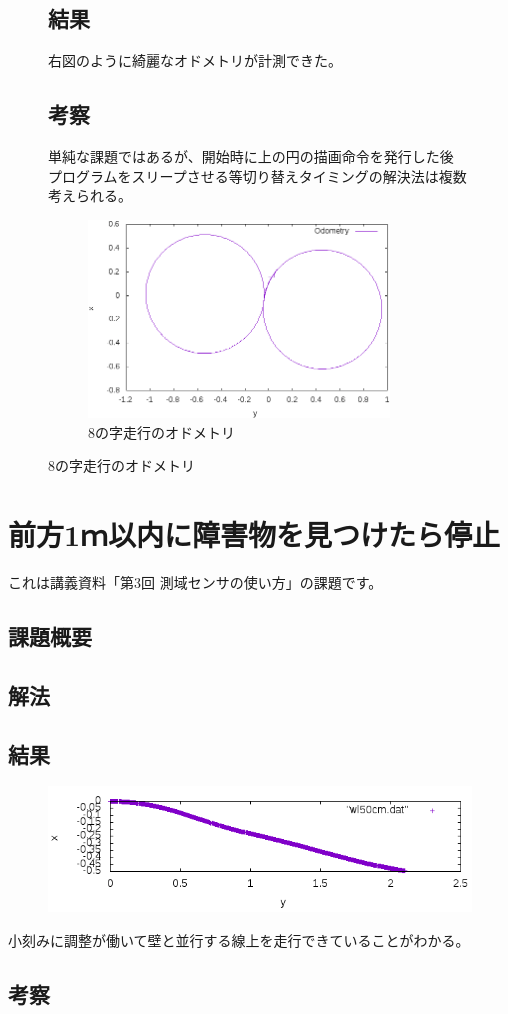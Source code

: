 \documentclass[main]{subfiles}
\begin{document}
\begin{figure}[H]
	\begin{minipage}{0.5\hsize}
		\setlength{\parindent}{1\Cwd}
		\section{結果}
		右図のように綺麗なオドメトリが計測できた。

		\section{考察}
		単純な課題ではあるが、開始時に上の円の描画命令を発行した後
		プログラムをスリープさせる等切り替えタイミングの解決法は複数考えられる。
	\end{minipage}
	\begin{minipage}{0.5\hsize}
		\begin{figure}[H]
			\centering
			\includegraphics[width=8cm]{img/eight.png}
			\caption{8の字走行のオドメトリ}
		\end{figure}
	\end{minipage}
\end{figure}

\chapter{前方1ｍ以内に障害物を見つけたら停止}

これは講義資料「第3回 測域センサの使い方」の課題です。

\section{課題概要}
\section{解法}

\section{結果}
\begin{figure}[H]
	\centering
	\includegraphics[width=15cm]{img/wl50cm.png}
\end{figure}
小刻みに調整が働いて壁と並行する線上を走行できていることがわかる。

\section{考察}
\end{document}
